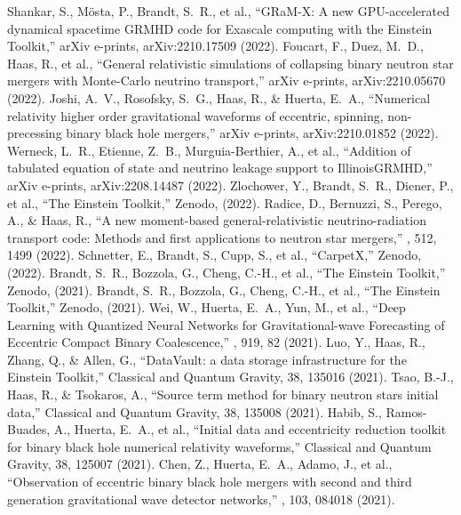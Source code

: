  Shankar, S., M{\"o}sta, P., Brandt, S.~R., et al., ``GRaM-X: A new GPU-accelerated dynamical spacetime GRMHD code for Exascale computing with the Einstein Toolkit,'' arXiv e-prints, arXiv:2210.17509 (2022).
 Foucart, F., Duez, M.~D., Haas, R., et al., ``General relativistic simulations of collapsing binary neutron star mergers with Monte-Carlo neutrino transport,'' arXiv e-prints, arXiv:2210.05670 (2022).
 Joshi, A.~V., Rosofsky, S.~G., Haas, R., \& Huerta, E.~A., ``Numerical relativity higher order gravitational waveforms of eccentric, spinning, non-precessing binary black hole mergers,'' arXiv e-prints, arXiv:2210.01852 (2022).
 Werneck, L.~R., Etienne, Z.~B., Murguia-Berthier, A., et al., ``Addition of tabulated equation of state and neutrino leakage support to IllinoisGRMHD,'' arXiv e-prints, arXiv:2208.14487 (2022).
 Zlochower, Y., Brandt, S.~R., Diener, P., et al., ``The Einstein Toolkit,'' Zenodo, (2022).
 Radice, D., Bernuzzi, S., Perego, A., \& Haas, R., ``A new moment-based general-relativistic neutrino-radiation transport code: Methods and first applications to neutron star mergers,'' \mnras, 512, 1499 (2022).
 Schnetter, E., Brandt, S., Cupp, S., et al., ``CarpetX,'' Zenodo, (2022).
 Brandt, S.~R., Bozzola, G., Cheng, C.-H., et al., ``The Einstein Toolkit,'' Zenodo, (2021).
 Brandt, S.~R., Bozzola, G., Cheng, C.-H., et al., ``The Einstein Toolkit,'' Zenodo, (2021).
 Wei, W., Huerta, E.~A., Yun, M., et al., ``Deep Learning with Quantized Neural Networks for Gravitational-wave Forecasting of Eccentric Compact Binary Coalescence,'' \apj, 919, 82 (2021).
 Luo, Y., Haas, R., Zhang, Q., \& Allen, G., ``DataVault: a data storage infrastructure for the Einstein Toolkit,'' Classical and Quantum Gravity, 38, 135016 (2021).
 Tsao, B.-J., Haas, R., \& Tsokaros, A., ``Source term method for binary neutron stars initial data,'' Classical and Quantum Gravity, 38, 135008 (2021).
 Habib, S., Ramos-Buades, A., Huerta, E.~A., et al., ``Initial data and eccentricity reduction toolkit for binary black hole numerical relativity waveforms,'' Classical and Quantum Gravity, 38, 125007 (2021).
 Chen, Z., Huerta, E.~A., Adamo, J., et al., ``Observation of eccentric binary black hole mergers with second and third generation gravitational wave detector networks,'' \prd, 103, 084018 (2021).
